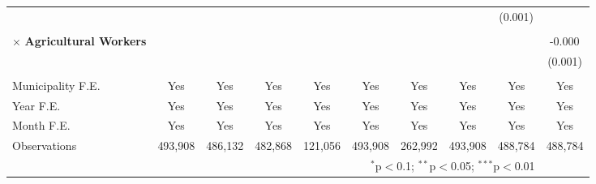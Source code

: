\begin{tabular}{@{\extracolsep{5pt}}lccccccccc}
& & & & & & & & (0.001) & \\
\\
\hspace{4pt} $\times$ \textbf{Agricultural Workers} & & & & & & & & & -0.000$^{}$ \\
& & & & & & & & & (0.001) \\
\\
\hline
Municipality F.E. & Yes & Yes & Yes & Yes & Yes & Yes & Yes & Yes & Yes\\
Year F.E. & Yes & Yes & Yes & Yes & Yes & Yes & Yes & Yes & Yes \\
Month F.E. & Yes & Yes & Yes & Yes & Yes & Yes & Yes & Yes & Yes\\
Observations & 493,908 & 486,132 & 482,868 & 121,056 & 493,908 & 262,992 & 493,908 & 488,784 & 488,784 \\
\hline
\hline
\multicolumn{9}{r}{$^{*}$p$<$0.1; $^{**}$p$<$0.05; $^{***}$p$<$0.01}
\end{tabular}

